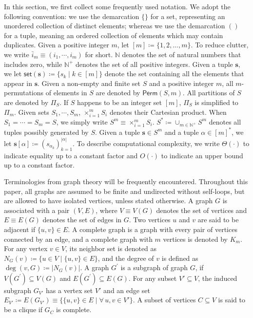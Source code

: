 \documentclass[12pt]{article}
\theoremstyle{plain}
\theoremstyle{definition}
\newcommand{\takesetp}[1]{\mathsf{set}(#1)}
\newcommand{\perm}[1]{\mathsf{Perm}(#1)}
\newcommand{\partition}{\Pi}
\newcommand{\partitionp}[1]{\partition_{#1}}
\newcommand{\degp}[2]{\deg(#1,#2)}
\newcommand{\completegraphp}[1]{K_{#1}}
\newcommand{\less}{O}
\newcommand{\appequal}{\Theta}
\newcommand{\naturals}{\mathbb{N}}
\newcommand{\positivenaturals}{\mathbb{N}^+}
\begin{document}
\begin{bibunit}[agsm]
In this section, we first collect some frequently used notation. We adopt the following convention: we use the demarcation $\{\}$ for a set, representing an unordered collection of distinct elements; whereas we use the demarcation $()$ for a tuple, meaning an ordered collection of elements which may contain duplicates. Given a positive integer $m$, let $[m] \coloneqq \{1, 2, \ldots, m\}$. To reduce clutter, we write $\bar{i}_{m} \equiv (i_{1}, \cdots, i_{m})$ for short. $\naturals$ denotes the set of natural numbers that includes zero, while $\positivenaturals$ denotes the set of all positive integers. Given a tuple $\bm{s}$, we let $\takesetp{\bm{s}} \coloneqq \{s_k \mid k\in [m]\}$ denote the set containing all the elements that appear in $\bm{s}$. Given a non-empty and finite set $S$ and a positive integer $m$, all $m$-permutations of elements in $S$ are denoted by $\perm{S, m}$. All partitions of $S$ are denoted by $\partitionp{S}$. If $S$ happens to be an integer set $[m]$, $\partitionp{S}$ is simplified to $\partitionp{m}$. Given sets $S_{1}, \cdots, S_{m}$, $\times_{i = 1}^{m} S_{i}$ denotes their Cartesian product. When $S_{1} = \cdots = S_{m} = S$, we simply write $S^{m} \equiv \times_{i = 1}^{m} S_{i}$. $S^* \coloneqq \cup_{m \in \positivenaturals} S^m$ denotes all tuples possibly generated by $S$. Given a tuple $\bm{s} \in S^m$ and a tuple $\alpha \in [m]^*$, we let $\bm{s}[\alpha] \coloneqq (s_
{\alpha_k})_{k=1}^{|\alpha|}$. To describe computational complexity, we write $\appequal(\cdot)$ to indicate equality up to a constant factor and $\less(\cdot)$ to indicate an upper bound up to a constant factor.

Terminologies from graph theory will be frequently encountered. Throughout this paper, all graphs are assumed to be finite and undirected without self-loops, but are allowed to have isolated vertices, unless stated otherwise. A graph $G$ is associated with a pair $(V, E)$, where $V \equiv V (G)$ denotes the set of vertices and $E \equiv E (G)$ denotes the set of edges in $G$. Two vertices $u$ and $v$ are said to be adjacent if $\{u, v\} \in E$. A complete graph is a graph with every pair of vertices connected by an edge, and a complete graph with $m$ vertices is denoted by $\completegraphp{m}$. For any vertex $v \in V$, its neighbor set is denoted as $N_G (v) \coloneqq \{ u \in V \mid \{u, v\} \in E \}$, and the degree of $v$ is defined as $\degp{v}{G} \coloneqq |N_G(v)|$. A graph $G^\prime$ is a subgraph of graph $G$, if $V (G^\prime) \subseteq V (G)$ and $E (G^\prime) \subseteq E (G)$. For any subset $V' \subseteq V$, the induced subgraph $G_{V'}$ has a vertex set $V'$ and an edge set $E_{V'} \coloneqq E (G_{V'}) \equiv \{\{u, v\} \in E \mid \forall \, u, v \in V'\}$. A subset of vertices $C \subseteq V$ is said to be a clique if $G_{C}$ is complete.



\end{bibunit}
\end{document}
